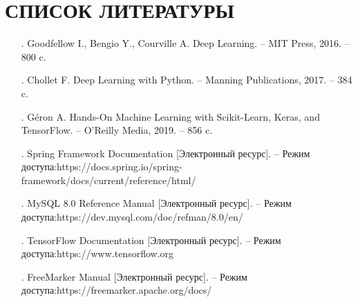\sectionbreak \section*{ 
    \gostTitleFont
    \redline
    СПИСОК ЛИТЕРАТУРЫ
}
\titlespace

{\gostFont

\begin{itemize}[leftmargin=2.15cm, labelwidth=0.65cm, labelsep=0.0cm] 

    \item[\theimagecntr.] Goodfellow I., Bengio Y., Courville A. Deep Learning. {--} MIT Press, 2016. {--} 800 c.  
    \addtocounter{imagecntr}{1}  

    \item[\theimagecntr.] Chollet F. Deep Learning with Python. {--} Manning Publications, 2017. {--} 384 c.  
    \addtocounter{imagecntr}{1}  

    \item[\theimagecntr.] Géron A. Hands-On Machine Learning with Scikit-Learn, Keras, and TensorFlow. {--} O'Reilly Media, 2019. {--} 856 c.  
    \addtocounter{imagecntr}{1}  

    \item[\theimagecntr.] Spring Framework Documentation [Электронный ресурс]. {--} Режим доступа:\newline https://docs.spring.io/spring-framework/docs/current/reference/html/  
    \addtocounter{imagecntr}{1}  

    \item[\theimagecntr.] MySQL 8.0 Reference Manual [Электронный ресурс]. {--} Режим доступа:\newline https://dev.mysql.com/doc/refman/8.0/en/  
    \addtocounter{imagecntr}{1}  

    \item[\theimagecntr.] TensorFlow Documentation [Электронный ресурс]. {--} Режим доступа:\newline https://www.tensorflow.org
    \addtocounter{imagecntr}{1}  

    \item[\theimagecntr.] FreeMarker Manual [Электронный ресурс]. {--} Режим доступа:\newline https://freemarker.apache.org/docs/  
    \addtocounter{imagecntr}{1}  

\end{itemize}

}
